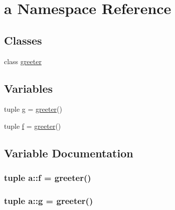 \hypertarget{namespacea}{\section{a \-Namespace \-Reference}
\label{namespacea}
}
\subsection*{\-Classes}
\begin{DoxyCompactItemize}
\item 
class \hyperlink{classa_1_1greeter}{greeter}
\end{DoxyCompactItemize}
\subsection*{\-Variables}
\begin{DoxyCompactItemize}
\item 
tuple \hyperlink{namespacea_a00704b66efca1dab3acbd10278789a5d}{g} = \hyperlink{classa_1_1greeter}{greeter}()
\item 
tuple \hyperlink{namespacea_aeb8bba16089d7caf7f3cd2a70f31a656}{f} = \hyperlink{classa_1_1greeter}{greeter}()
\end{DoxyCompactItemize}


\subsection{\-Variable \-Documentation}
\hypertarget{namespacea_aeb8bba16089d7caf7f3cd2a70f31a656}{
\subsubsection[{f}]{\setlength{\rightskip}{0pt plus 5cm}tuple {\bf a\-::f} = {\bf greeter}()}}\label{namespacea_aeb8bba16089d7caf7f3cd2a70f31a656}
\hypertarget{namespacea_a00704b66efca1dab3acbd10278789a5d}{
\subsubsection[{g}]{\setlength{\rightskip}{0pt plus 5cm}tuple {\bf a\-::g} = {\bf greeter}()}}\label{namespacea_a00704b66efca1dab3acbd10278789a5d}
